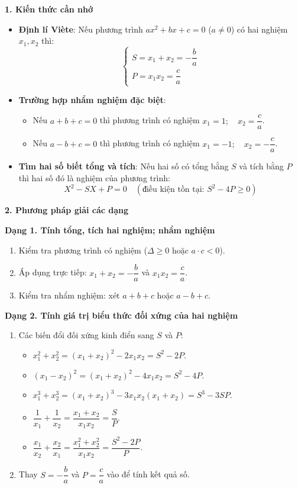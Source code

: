 \textbf{1. Kiến thức cần nhớ}
\begin{itemize}
\item \textbf{Định lí Viète}: Nếu phương trình $ax^2 + bx + c = 0$ ($a \ne 0$) có hai nghiệm $x_1, x_2$ thì:
$$\boxed{\begin{cases} S = x_1 + x_2 = -\dfrac{b}{a} \\ P = x_1 x_2 = \dfrac{c}{a} \end{cases}}$$
\item \textbf{Trường hợp nhẩm nghiệm đặc biệt}:
\begin{itemize}
\item Nếu $a + b + c = 0$ thì phương trình có nghiệm $\boxed{x_1 = 1;\quad x_2 = \dfrac{c}{a}}$.
\item Nếu $a - b + c = 0$ thì phương trình có nghiệm $\boxed{x_1 = -1;\quad x_2 = -\dfrac{c}{a}}$.
\end{itemize}
\item \textbf{Tìm hai số biết tổng và tích}: Nếu hai số có tổng bằng $S$ và tích bằng $P$ thì hai số đó là nghiệm của phương trình:
$$\boxed{X^2 - SX + P = 0}\quad (\text{điều kiện tồn tại: } S^2 - 4P \ge 0)$$
\end{itemize}

\textbf{2. Phương pháp giải các dạng}

\textbf{Dạng 1. Tính tổng, tích hai nghiệm; nhẩm nghiệm}
\begin{enumerate}
\item Kiểm tra phương trình có nghiệm ($\Delta \ge 0$ hoặc $a \cdot c < 0$).
\item Áp dụng trực tiếp: $x_1 + x_2 = -\dfrac{b}{a}$ và $x_1 x_2 = \dfrac{c}{a}$.
\item Kiểm tra nhẩm nghiệm: xét $a + b + c$ hoặc $a - b + c$.
\end{enumerate}

\textbf{Dạng 2. Tính giá trị biểu thức đối xứng của hai nghiệm}
\begin{enumerate}
\item Các biến đổi đối xứng kinh điển sang $S$ và $P$:
\begin{itemize}
\item $x_1^2 + x_2^2 = (x_1 + x_2)^2 - 2x_1 x_2 = \boxed{S^2 - 2P}$.
\item $(x_1 - x_2)^2 = (x_1 + x_2)^2 - 4x_1 x_2 = \boxed{S^2 - 4P}$.
\item $x_1^3 + x_2^3 = (x_1 + x_2)^3 - 3x_1 x_2(x_1 + x_2) = \boxed{S^3 - 3SP}$.
\item $\dfrac{1}{x_1} + \dfrac{1}{x_2} = \dfrac{x_1 + x_2}{x_1 x_2} = \boxed{\dfrac{S}{P}}$.
\item $\dfrac{x_1}{x_2} + \dfrac{x_2}{x_1} = \dfrac{x_1^2 + x_2^2}{x_1 x_2} = \boxed{\dfrac{S^2 - 2P}{P}}$.
\end{itemize}
\item Thay $S = -\dfrac{b}{a}$ và $P = \dfrac{c}{a}$ vào để tính kết quả số.
\end{enumerate}

